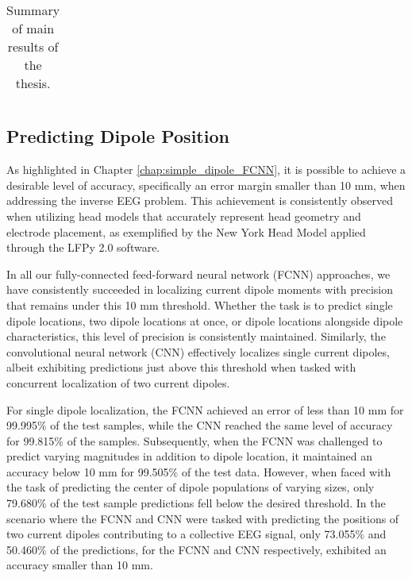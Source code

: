 \documentclass[a4paper, UKenglish, 11pt]{uiomaster}
\begin{document}
\begin{table}[]
\begin{tabular}{c|cccccc|}
\end{tabular}
\caption{Summary of main results of the thesis.}
\label{table:sum_main_results}
\end{table}


\subsection{Predicting Dipole Position}


As highlighted in Chapter \ref{chap:simple_dipole_FCNN}, it is possible to achieve a desirable level of accuracy, specifically an error margin smaller than 10 mm, when addressing the inverse EEG problem. This achievement is consistently observed when utilizing head models that accurately represent head geometry and electrode placement, as exemplified by the New York Head Model applied through the LFPy 2.0 software.

In all our fully-connected feed-forward neural network (FCNN) approaches, we have consistently succeeded in localizing current dipole moments with precision that remains under this 10 mm threshold. Whether the task is to predict single dipole locations, two dipole locations at once, or dipole locations alongside dipole characteristics, this level of precision is consistently maintained. Similarly, the convolutional neural network (CNN) effectively localizes single current dipoles, albeit exhibiting predictions just above this threshold when tasked with concurrent localization of two current dipoles.

For single dipole localization, the FCNN achieved an error of less than 10 mm for 99.995$\%$ of the test samples, while the CNN reached the same level of accuracy for 99.815$\%$ of the samples. Subsequently, when the FCNN was challenged to predict varying magnitudes in addition to dipole location, it maintained an accuracy below 10 mm for 99.505$\%$ of the test data. However, when faced with the task of predicting the center of dipole populations of varying sizes, only 79.680$\%$ of the test sample predictions fell below the desired threshold. In the scenario where the FCNN and CNN were tasked with predicting the positions of two current dipoles contributing to a collective EEG signal, only 73.055$\%$ and 50.460$\%$ of the predictions, for the FCNN and CNN respectively, exhibited an accuracy smaller than 10 mm.
\end{document}
